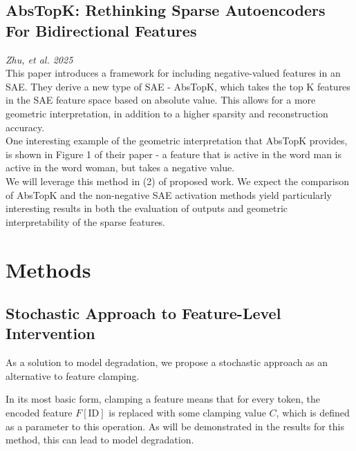 \documentclass{article}
\begin{document}
\subsection{AbsTopK: Rethinking Sparse Autoencoders For Bidirectional Features}
\textit{Zhu, et al. 2025}
\cite{abstopk}\\

This paper introduces a framework for including negative-valued features in an SAE. They derive a new type of SAE - AbsTopK, which takes the top K features in the SAE feature space based on absolute value. This allows for a more geometric interpretation, in addition to a higher sparsity and reconstruction accuracy.\\

One interesting example of the geometric interpretation that AbsTopK provides, is shown in Figure 1 of their paper - a feature that is active in the word man is active in the word woman, but takes a negative value. \\

We will leverage this method in (2) of proposed work. We expect the comparison of AbsTopK and the non-negative SAE activation methods yield particularly interesting results in both the evaluation of outputs and geometric interpretability of the sparse features.\\

\section{Methods}

\subsection{Stochastic Approach to Feature-Level Intervention}

As a solution to model degradation, we propose a stochastic approach as an alternative to feature clamping.

In its most basic form, clamping a feature means that for every token, the encoded feature $F[\text{ID}]$ is replaced with some clamping value $C$, which is defined as a parameter to this operation. As will be demonstrated in the results for this method, this can lead to model degradation.\\
\end{document}
